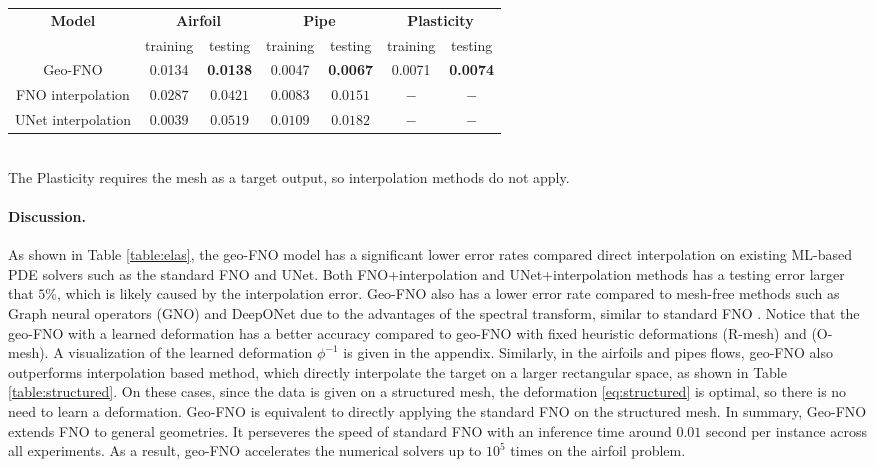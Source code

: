 \documentclass{article}
\begin{document}
\begin{table*}
\begin{center}
\begin{tabular}{c|cc|cc|cc}
\multicolumn{1}{c}{\bf Model}
&\multicolumn{2}{|c}{\bf Airfoil}
&\multicolumn{2}{|c}{\bf Pipe}
&\multicolumn{2}{|c}{\bf Plasticity}\\
& training & testing & training & testing & training & testing\\
\hline 
\hline 
Geo-FNO & 0.0134 & \textbf{0.0138} & 0.0047 & \textbf{0.0067} & 0.0071 & \textbf{0.0074} \\
FNO interpolation & $0.0287$ & $0.0421$ & $0.0083$ & $0.0151$ & $-$ & $-$  \\
UNet interpolation & $0.0039$ & $0.0519$ & $0.0109$ & $0.0182$ & $-$ & $-$ \\
\hline
\hline 
\end{tabular}\\
{\small The Plasticity requires the mesh as a target output, so interpolation methods do not apply.}
\end{center}
\caption{Benchmark on airfoils, pipe flows, and plasticity. Inputs are structured meshes.} 
\label{table:structured}
\end{table*}  


\paragraph{Discussion.} As shown in Table \ref{table:elas}, the geo-FNO model has a significant lower error rates compared direct interpolation on existing ML-based PDE solvers such as the standard FNO\citep{li2020fourier} and UNet\citep{ronneberger2015u}. Both FNO+interpolation and UNet+interpolation methods has a testing error larger that $5\%$, which is likely caused by the interpolation error. Geo-FNO also has a lower error rate compared to mesh-free methods such as Graph neural operators (GNO) \citep{li2020neural} and DeepONet \citep{lu2019deeponet} due to the advantages of the spectral transform,  similar to standard FNO \citep{de2022cost}. Notice that the geo-FNO with a learned deformation has a better accuracy compared to geo-FNO with fixed heuristic deformations (R-mesh) and (O-mesh).
A visualization of the learned deformation $\phi^{-1}$ is given in the appendix.
Similarly, in the airfoils and pipes flows, geo-FNO also outperforms interpolation based method, which directly interpolate the target on a larger rectangular space, as shown in Table \ref{table:structured}. 
On these cases, since the data is given on a structured mesh, the deformation \eqref{eq:structured} is optimal, so there is no need to learn a deformation. Geo-FNO is equivalent to directly applying the standard FNO on the structured mesh.
In summary, Geo-FNO extends FNO to general geometries. It perseveres the speed of standard FNO with an inference time around $0.01$ second per instance across all experiments. As a result, geo-FNO accelerates the numerical solvers up to $10^5$ times on the airfoil problem.
\end{document}
